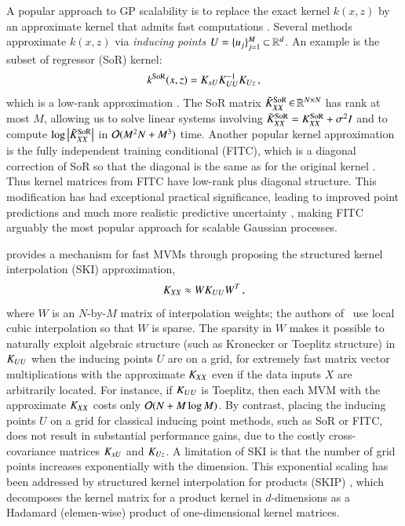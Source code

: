 A popular approach to GP scalability is to replace the exact kernel $k(x, z)$
by an approximate kernel that admits fast computations 
\cite{quinonero2005unifying}. Several methods approximate $k(x, z)$ via {\em
inducing points} $U = \{u_j\}_{j=1}^M \mathbin{\subset} \mathbb{R}^d$. An example is the
subset of regressor (SoR) kernel:
\begin{equation}\label{eqn:SoR}
  k^{\operatorname{SoR}}(x, z) = K_{xU}K_{UU}^{-1}K_{Uz}\,,
\end{equation}
which is a low\hyp{}rank approximation \cite{silverman1985some}. The SoR matrix
$\tilde{K}_{XX}^{\operatorname{SoR}} \operatorname{\in} \mathbb{R}^{N \times N}$ has rank at most $M$, allowing us to
solve linear systems involving $\tilde{K}_{XX}^{\operatorname{SoR}} = K_{XX}^{\operatorname{SoR}} + \sigma^2I$
and to compute $\log\left\lvert\tilde{K}_{XX}^{\operatorname{SoR}}\right\rvert$ in $\mathcal{O}(M^2 N + M^3)$ time.
Another popular kernel approximation is the fully independent training
conditional (FITC), which is a diagonal correction of SoR so that the diagonal
is the same as for the original kernel \cite{snelson2006sparse}.  Thus kernel
matrices from FITC have low\hyp{}rank plus diagonal structure. This modification
has had exceptional practical significance, leading to improved point
predictions and much more realistic predictive uncertainty 
\cite{quinonero2005unifying,quinonero2007}, making FITC arguably the most
popular approach for scalable Gaussian processes.

\citet{wilson2015kernel} provides a mechanism for fast MVMs through proposing
the structured kernel interpolation (SKI) approximation,
\begin{equation}\label{eqn:ski}
  K_{XX} \approx W K_{UU} W^{T}\,,
\end{equation}
where $W$ is an $N$\hyp{}by\hyp{}$M$ matrix of interpolation weights; the
authors of~\cite{wilson2015kernel} use local cubic interpolation so that $W$ is
sparse. The sparsity in $W$ makes it possible to naturally exploit algebraic
structure (such as Kronecker or Toeplitz structure) in $K_{UU}$ when the
inducing points $U$ are on a grid, for extremely fast matrix vector
multiplications with the approximate $K_{XX}$ even if the data inputs $X$ are
arbitrarily located. For instance, if $K_{UU}$ is Toeplitz, then each MVM with
the approximate $K_{XX}$ costs only $\mathcal{O}(N + M \log M)$. By contrast, placing
the inducing points $U$ on a grid for classical inducing point methods, such as
SoR or FITC, does not result in substantial performance gains, due to the costly
cross-covariance matrices $K_{xU}$ and $K_{Uz}$. A limitation of SKI is that the
number of grid points increases exponentially with the dimension. This
exponential scaling has been addressed by structured kernel interpolation for
products (SKIP) \citep{gardner2018product}, which decomposes the kernel matrix
for a product kernel in $d$\hyp{}dimensions as a Hadamard (elemen\hyp{}wise)
product of one\hyp{}dimensional kernel matrices.